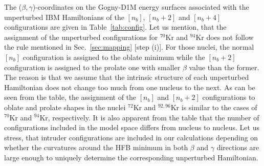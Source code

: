 \documentclass[twocolumn,showpacs,amsmath,amssymb,superscriptaddress]{revtex4-1}
\begin{document}
The ($\beta,\gamma$)-coordinates  on
the Gogny-D1M energy surfaces 
associated with the unperturbed IBM Hamiltonians of the $[n_b]$, $[n_b+2]$
and $[n_b+4]$ configurations are given in Table~\ref{tab:config}. Let us mention, that
the assignment of the unperturbed
configurations for  $^{70}$Kr and $^{94}$Kr does not follow
the rule mentioned in Sec.~\ref{sec:mapping} [step (i)]. For those 
nuclei, the normal
$[n_b]$ configuration is assigned to the oblate minimum while 
the $[n_b+2]$ configuration is assigned to the prolate
one with smaller $\beta$ value than the former. 
The reason is that
we assume that the 
intrinsic
structure of each unperturbed Hamiltonian does not change too much from
one nucleus to the next. As can be seen from the table, the 
assignment of the $[n_b]$ and $[n_b+2]$ configurations 
to oblate and prolate shapes in the nuclei 
$^{72}$Kr and $^{92,96}$Kr is similar to the cases 
of $^{70}$Kr
and $^{94}$Kr, respectively. 
It is also apparent from the table that the 
number of configurations included in the model space differs from
nucleus to nucleus. Let us stress, that intruder configurations are 
included in our calculations depending on whether the curvatures around
the HFB minimum in both $\beta$ and $\gamma$ directions 
are large enough to uniquely determine the corresponding unperturbed
Hamiltonian. 
\end{document}
